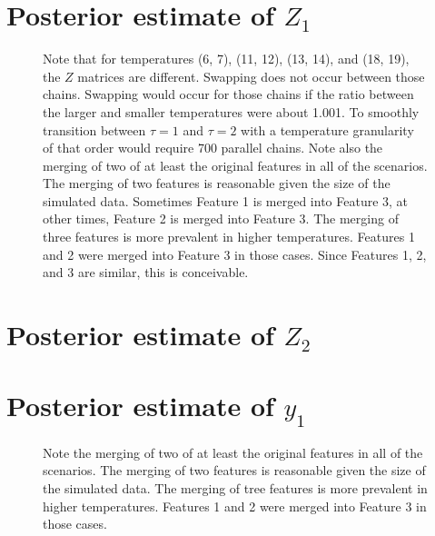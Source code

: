 \documentclass[10pt]{article} %
\begin{document}
\newpage
\section{Posterior estimate of $Z_1$}
\begin{figure}[H]
  \begin{center}  %
  \end{center}
  \caption{Note that for temperatures (6, 7), (11, 12), (13, 14), and (18, 19),
  the $Z$ matrices are different. Swapping does not occur between those chains.
  Swapping would occur for those chains if the ratio between the larger and smaller
  temperatures were about 1.001. To smoothly transition between $\tau=1$ and
  $\tau=2$ with a temperature granularity of that order would require 700 parallel
  chains. Note also the merging of two of at least the original features in all of
  the scenarios. The merging of two features is reasonable given the size of
  the simulated data. Sometimes Feature 1 is merged into Feature 3, at other times,
  Feature 2 is merged into Feature 3. The merging of three features is more
  prevalent in higher temperatures. Features 1 and 2 were merged into Feature 3
  in those cases. Since Features 1, 2, and 3 are similar, this is conceivable.}
  \label{fig:z1est}
\end{figure}

\newpage
\section{Posterior estimate of $Z_2$}
\begin{figure}[H]
  \begin{center}  %
  \end{center}
  \label{fig:z2est}
\end{figure}

\newpage
\section{Posterior estimate of $y_1$}
\begin{figure}[H]
  \begin{center}  %
  \end{center}
  \label{fig:yzest}
  \caption{Note the merging of two of at least the original features in all of
  the scenarios. The merging of two features is reasonable given the size of
  the simulated data. The merging of tree features is more prevalent in higher
  temperatures. Features 1 and 2 were merged into Feature 3 in those
  cases.}
\end{figure}
\end{document}
